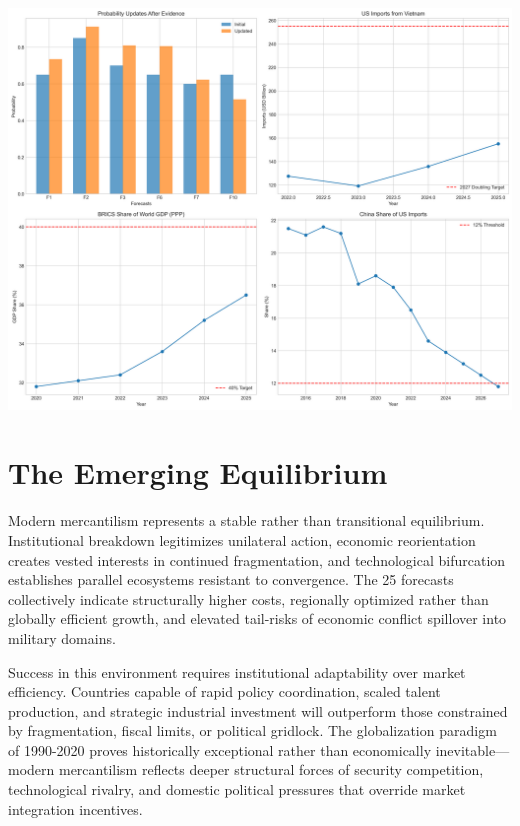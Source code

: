 \documentclass{article}
\begin{document}
\begin{multicols}{2}
\begin{center}
\includegraphics[width=0.9\columnwidth]{bayesian_analysis.png}
\end{center}

\end{multicols}

\section{The Emerging Equilibrium}

Modern mercantilism represents a stable rather than transitional equilibrium. Institutional breakdown legitimizes unilateral action, economic reorientation creates vested interests in continued fragmentation, and technological bifurcation establishes parallel ecosystems resistant to convergence. The 25 forecasts collectively indicate structurally higher costs, regionally optimized rather than globally efficient growth, and elevated tail-risks of economic conflict spillover into military domains.

Success in this environment requires institutional adaptability over market efficiency. Countries capable of rapid policy coordination, scaled talent production, and strategic industrial investment will outperform those constrained by fragmentation, fiscal limits, or political gridlock. The globalization paradigm of 1990-2020 proves historically exceptional rather than economically inevitable—modern mercantilism reflects deeper structural forces of security competition, technological rivalry, and domestic political pressures that override market integration incentives.
\end{document}
